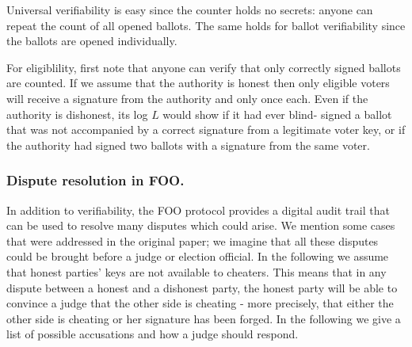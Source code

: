 \documentclass{llncs}
\begin{document}
Universal verifiability is easy since the counter holds no secrets: anyone can
repeat the count of all opened ballots. The same holds for ballot verifiability
since the ballots are opened individually.

For eligiblility, first note that anyone can verify that only correctly signed
ballots are counted. If we assume that the authority is honest then only
eligible voters will receive a signature from the authority and only once each.
Even if the authority is dishonest, its log $L$ would show if it had ever blind-
signed a ballot that was not accompanied by a correct signature from a
legitimate voter key, or if the authority had signed two ballots with a
signature from the same voter.

\subsubsection{Dispute resolution in FOO.}

In addition to verifiability, the FOO protocol provides a digital audit trail
that can be used to resolve many disputes which could arise. We mention some
cases that were addressed in the original paper; we imagine that all these
disputes could be brought before a judge or election official.
In the following we assume that honest parties' keys are not available to
cheaters. This means that in any dispute between a honest and a dishonest party,
the honest party will be able to convince a judge that the other side is
cheating - more precisely, that either the other side is cheating or her
signature has been forged.
In the following we give a list of possible accusations and how a judge should
respond.
\end{document}
